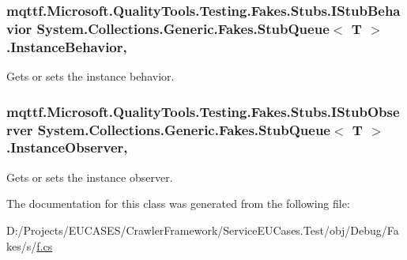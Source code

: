 \hypertarget{class_system_1_1_collections_1_1_generic_1_1_fakes_1_1_stub_queue_3_01_t_01_4_a029837da11e5b258b6b9759a003271e5}{
\subsubsection[{Instance\-Behavior}]{\setlength{\rightskip}{0pt plus 5cm}mqttf.\-Microsoft.\-Quality\-Tools.\-Testing.\-Fakes.\-Stubs.\-I\-Stub\-Behavior System.\-Collections.\-Generic.\-Fakes.\-Stub\-Queue$<$ T $>$.Instance\-Behavior\hspace{0.3cm}{\ttfamily [get]}, {\ttfamily [set]}}}\label{class_system_1_1_collections_1_1_generic_1_1_fakes_1_1_stub_queue_3_01_t_01_4_a029837da11e5b258b6b9759a003271e5}


Gets or sets the instance behavior.

\hypertarget{class_system_1_1_collections_1_1_generic_1_1_fakes_1_1_stub_queue_3_01_t_01_4_aa9deb942e1e7fdee4ab3761e1715378a}{
\subsubsection[{Instance\-Observer}]{\setlength{\rightskip}{0pt plus 5cm}mqttf.\-Microsoft.\-Quality\-Tools.\-Testing.\-Fakes.\-Stubs.\-I\-Stub\-Observer System.\-Collections.\-Generic.\-Fakes.\-Stub\-Queue$<$ T $>$.Instance\-Observer\hspace{0.3cm}{\ttfamily [get]}, {\ttfamily [set]}}}\label{class_system_1_1_collections_1_1_generic_1_1_fakes_1_1_stub_queue_3_01_t_01_4_aa9deb942e1e7fdee4ab3761e1715378a}


Gets or sets the instance observer.



The documentation for this class was generated from the following file\-:\begin{DoxyCompactItemize}
\item 
D\-:/\-Projects/\-E\-U\-C\-A\-S\-E\-S/\-Crawler\-Framework/\-Service\-E\-U\-Cases.\-Test/obj/\-Debug/\-Fakes/s/\hyperlink{s_2f_8cs}{f.\-cs}\end{DoxyCompactItemize}
